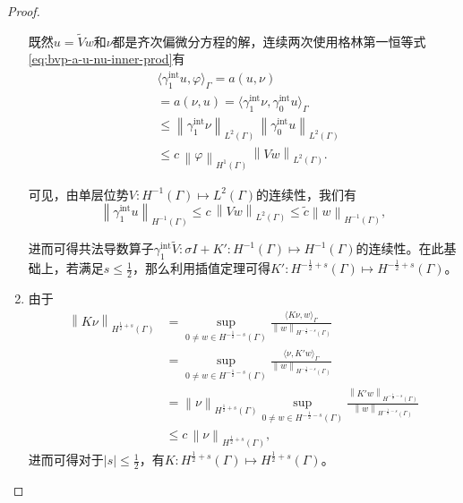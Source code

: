 \begin{proof}
\begin{enumerate}
  既然$u = \widetilde{V} w$和$\nu$都是齐次偏微分方程的解，连续两次使用格林第一恒等式\eqref{eq:bvp-a-u-nu-inner-prod}有
  \begin{equation*}
    \begin{split}
    & \langle \gamma_{1}^{\text{int}} u, \varphi \rangle_{\Gamma}
    = a \left( u,\nu \right) \\
    & = a \left( \nu, u \right) =
    \langle \gamma_{1}^{\text{int}} \nu, \gamma_{0}^{\text{int}} u \rangle_{\Gamma}\\
    & \le \left\| \gamma_{1}^{\text{int}} \nu \right\|_{L^{2}(\Gamma)} \,
    \left\| \gamma_{0}^{\text{int}} u \right\|_{L^{2}(\Gamma)} \\
    & \le c \, \left\| \varphi \right\|_{H^{1}(\Gamma)} \, \left\| V w \right\|_{L^{2}(\Gamma)}.
  \end{split}
\end{equation*}

可见，由单层位势$V:H^{-1}(\Gamma) \mapsto L^{2}(\Gamma)$的连续性，我们有
\begin{equation*}
  \left\| \gamma_{1}^{\text{int}} u \right\|_{H^{-1}(\Gamma)}
  \le c \, \left\| V w \right\|_{L^{2}(\Gamma)}
  \le \widetilde{c} \left\| w \right\|_{H^{-1}(\Gamma)} ,
\end{equation*}

进而可得共法导数算子$\gamma_{1}^{\text{int}} \widetilde{V} : \sigma I + K': H^{-1}(\Gamma) \mapsto H^{-1}(\Gamma)$的连续性。在此基础上，若满足$s \le \frac{1}{2}$，那么利用插值定理可得$K' : H^{-\frac{1}{2} + s}(\Gamma) \mapsto H^{-\frac{1}{2} + s}(\Gamma)$。

\item 由于
\begin{equation*}
  \begin{split}
    \left\| K \nu \right\|_{H^{\frac{1}{2}+s}(\Gamma)}
    & = \sup_{0 \neq w \in H^{-\frac{1}{2}-s}(\Gamma)}
    \frac{
    \langle K \nu, w \rangle_{\Gamma}
    }{
    \left\| w \right\|_{H^{-\frac{1}{2}-s}(\Gamma)}
    } \\
    & = \sup_{0 \neq w \in H^{-\frac{1}{2}-s}(\Gamma)}
    \frac{
    \langle \nu, K' w \rangle_{\Gamma}
    }{
    \left\| w \right\|_{H^{-\frac{1}{2}-s}(\Gamma)}
    } \\
    & = \left\| \nu \right\|_{H^{\frac{1}{2} + s}(\Gamma)}
    \sup_{0 \neq w \in H^{-\frac{1}{2}-s}(\Gamma)}
    \frac{
    \left\| K' w \right\|_{H^{-\frac{1}{2}-s}(\Gamma)}
    }{
    \left\| w \right\|_{H^{-\frac{1}{2}-s}(\Gamma)}
    }\\
    & \le c \, \left\| \nu \right\|_{H^{\frac{1}{2} + s}(\Gamma)},
  \end{split}
\end{equation*}
  进而可得对于$\left| s \right| \le \frac{1}{2}$，有$K: H^{\frac{1}{2} + s}(\Gamma) \mapsto H^{\frac{1}{2} + s}(\Gamma)$。


\end{enumerate}
\end{proof}
